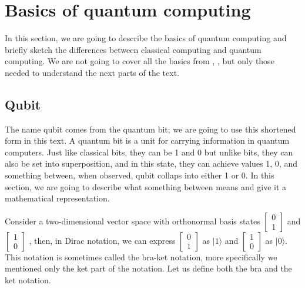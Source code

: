 \chapter{Basics of quantum computing} \label{basicschapter}

In this section, we are going to describe the basics of quantum computing and briefly sketch the differences between classical computing and quantum computing. We are not going to cover all the basics from \cite{adedoyin2018quantum}, \cite{strubell2011introduction}, but only those needed to understand the next parts of the text. 

\section{Qubit}

The name qubit comes from the quantum bit; we are going to use this shortened form in this text. A quantum bit is a unit for carrying information in quantum computers. Just like classical bits, they can be 1 and 0 but unlike bits, they can also be set into superposition, and in this state, they can achieve values 1, 0, and something between, when observed, qubit collaps into either 1 or 0. In this section, we are going to describe what something between means and give it a mathematical representation.


Consider a two-dimensional vector space with orthonormal basis states 
$\begin{bmatrix}
     0\\
     1
\end{bmatrix}$
and
$\begin{bmatrix}
     1\\
     0
\end{bmatrix}$
, then, in Dirac notation, we can express 
$\begin{bmatrix}
     0\\
     1
\end{bmatrix}$
as
$|1\rangle$
and
$\begin{bmatrix}
     1\\
     0
\end{bmatrix}$
as
$|0\rangle$. This notation is sometimes called the bra-ket notation, more specifically we mentioned only the ket part of the notation. Let us define both the bra and the ket notation.

